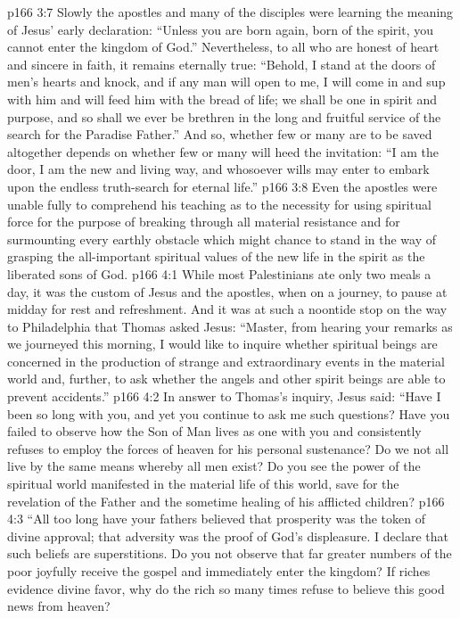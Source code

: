 \vs p166 3:7 Slowly the apostles and many of the disciples were learning the meaning of Jesus’ early declaration: \textcolor{ubdarkred}{“Unless you are born again, born of the spirit, you cannot enter the kingdom of God.”} Nevertheless, to all who are honest of heart and sincere in faith, it remains eternally true: \textcolor{ubdarkred}{“Behold, I stand at the doors of men’s hearts and knock, and if any man will open to me, I will come in and sup with him and will feed him with the bread of life; we shall be one in spirit and purpose, and so shall we ever be brethren in the long and fruitful service of the search for the Paradise Father.”} And so, whether few or many are to be saved altogether depends on whether few or many will heed the invitation: \textcolor{ubdarkred}{“I am the door, I am the new and living way, and whosoever wills may enter to embark upon the endless truth\hyp{}search for eternal life.”}
\vs p166 3:8 Even the apostles were unable fully to comprehend his teaching as to the necessity for using spiritual force for the purpose of breaking through all material resistance and for surmounting every earthly obstacle which might chance to stand in the way of grasping the all\hyp{}important spiritual values of the new life in the spirit as the liberated sons of God.\plusone
{}
\vs p166 4:1 While most Palestinians ate only two meals a day, it was the custom of Jesus and the apostles, when on a journey, to pause at midday for rest and refreshment. And it was at such a noontide stop on the way to Philadelphia that Thomas asked Jesus: “Master, from hearing your remarks as we journeyed this morning, I would like to inquire whether spiritual beings are concerned in the production of strange and extraordinary events in the material world and, further, to ask whether the angels and other spirit beings are able to prevent accidents.”
\pc \vs p166 4:2 In answer to Thomas’s inquiry, Jesus said: \textcolor{ubdarkred}{“Have I been so long with you, and yet you continue to ask me such questions? Have you failed to observe how the Son of Man lives as one with you and consistently refuses to employ the forces of heaven for his personal sustenance? Do we not all live by the same means whereby all men exist? Do you see the power of the spiritual world manifested in the material life of this world, save for the revelation of the Father and the sometime healing of his afflicted children?}
\vs p166 4:3 \textcolor{ubdarkred}{“All too long have your fathers believed that prosperity was the token of divine approval; that adversity was the proof of God’s displeasure. I declare that such beliefs are superstitions. Do you not observe that far greater numbers of the poor joyfully receive the gospel and immediately enter the kingdom? If riches evidence divine favor, why do the rich so many times refuse to believe this good news from heaven?}
